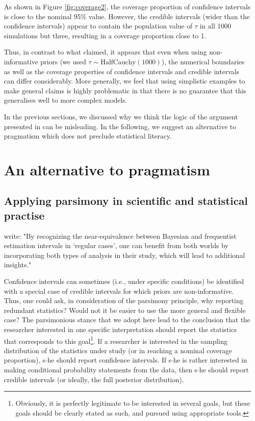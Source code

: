 \documentclass[a4paper,man,natbib,floatsintext,donotrepeattitle]{apa6}
\begin{document}
As shown in Figure \ref{fig:coverage2}, the coverage proportion of confidence intervals is close to the nominal 95\% value. However, the credible intervals (wider than the confidence intervals) appear to contain the population value of $\tau$ in all 1000 simulations but three, resulting in a coverage proportion close to 1.

Thus, in contrast to what \cite{albers_credible_2018} claimed, it appears that even when using non-informative priors (we used $\tau \sim \mathrm{HalfCauchy}(1000)$), the numerical boundaries as well as the coverage properties of confidence intervals and credible intervals can differ considerably. More generally, we feel that using simplistic examples to make general claims is highly problematic in that there is no guarantee that this generalises well to more complex models.

In the previous sections, we discussed why we think the logic of the argument presented in \cite{albers_credible_2018} can be misleading. In the following, we suggest an alternative to pragmatism which does not preclude statistical literacy.

\section{An alternative to pragmatism}

\subsection{Applying parsimony in scientific and statistical practise}

\cite{albers_credible_2018} write: "By recognizing the near-equivalence between Bayesian and frequentist estimation intervals in ‘regular cases’, one can benefit from both worlds by incorporating both types of analysis in their study, which will lead to additional insights."

Confidence intervals can sometimes (i.e., under specific conditions) be identified with a special case of credible intervals for which priors are non-informative. Thus, one could ask, in consideration of the parsimony principle, why reporting redundant statistics? Would not it be easier to use the more general and flexible case? The parsimonious stance that we adopt here lead to the conclusion that the researcher interested in one specific interpretation should report the statistics that corresponds to this goal\footnote{Obviously, it is perfectly legitimate to be interested in several goals, but these goals should be clearly stated as such, and pursued using appropriate tools.}. If a researcher is interested in the sampling distribution of the statistics under study (or in reaching a nominal coverage proportion), s$\cdot$he should report confidence intervals. If s$\cdot$he is rather interested in making conditional probability statements from the data, then s$\cdot$he should report credible intervals (or ideally, the full posterior distribution).
\end{document}
